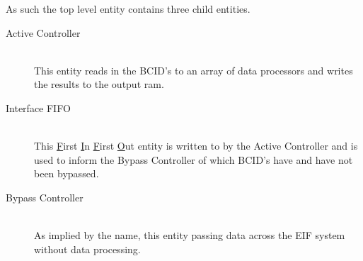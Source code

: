 		As such the top level entity contains three child entities.

		\begin{description}
			\item[Active Controller] \hfill \\
				This entity reads in the BCID's to an array of data processors and writes the results to the output ram.
			\item[Interface FIFO] \hfill \\
				This \underline{F}irst \underline{I}n \underline{F}irst \underline{O}ut entity is written to by the Active Controller and is used to inform the Bypass Controller of which BCID's have and have not been bypassed.
			\item[Bypass Controller] \hfill \\
				As implied by the name, this entity passing data across the EIF system without data processing.

		\end{description}





